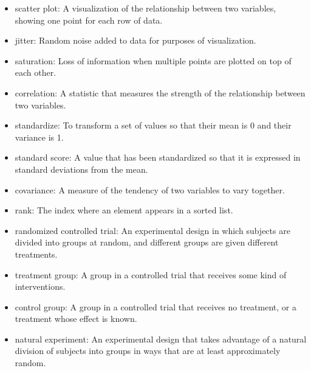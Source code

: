 \documentclass[12pt]{book}
\begin{document}
\begin{itemize}

\item scatter plot: A visualization of the relationship between
two variables, showing one point for each row of data.

\item jitter: Random noise added to data for purposes of
visualization.

\item saturation: Loss of information when multiple points are
plotted on top of each other. 

\item correlation: A statistic that measures the strength of the
relationship between two variables.

\item standardize: To transform a set of values so that their mean is 0 and
their variance is 1.

\item standard score: A value that has been standardized so that it is
  expressed in standard deviations from the mean.

\item covariance: A measure of the tendency of two variables
to vary together.

\item rank: The index where an element appears in a sorted list.

\item randomized controlled trial: An experimental design in which subjects
are divided into groups at random, and different groups are given different
treatments.

\item treatment group: A group in a controlled trial that receives
some kind of interventions.

\item control group: A group in a controlled trial that receives no
treatment, or a treatment whose effect is known.

\item natural experiment: An experimental design that takes advantage of
a natural division of subjects into groups in ways that are at least
approximately random.

\end{itemize}
\end{document}
